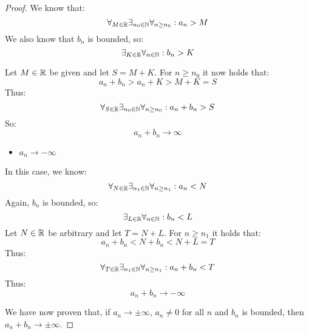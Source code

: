\documentclass[week=3]{homework}
\begin{document}
\begin{questions}
\begin{parts}
\begin{proof}
		    	We know that:
		    	\[
			    	\forall_{M \in \mathbb{R}}\exists_{n_0 \in \mathbb{N}} \forall_{n \ge n_0}: a_n > M
		    	\]
		    	We also know that $b_n$ is bounded, so:
		    	\[
			    	\exists_{K \in \mathbb{R}} \forall_{n \in \mathbb{N}}: b_n > K
		    	\]
		    	
		    	Let $M \in \mathbb{R}$ be given and let $S = M + K$. For $n \ge n_0$ it now holds that:
		    	\[
			    	a_n + b_n > a_n + K > M + K = S
		    	\]
		    	Thus: 
		    	\[
			    	\forall_{S \in \mathbb{R}}\exists_{n_0 \in \mathbb{N}} \forall_{n \ge n_0}: a_n + b_n > S
		    	\]
		    	So:
		    	\[
			    	a_n + b_n \to \infty
		    	\]
		    	
		    	\begin{itemize}
		    		\item $a_n \to - \infty$			    
	    		\end{itemize}
	    		
	    		In this case, we know:
	    		\[
		    		\forall_{N \in \mathbb{R}}\exists_{n_1 \in \mathbb{N}} \forall_{n \ge n_1}: a_n < N
	    		\]
	    		Again, $b_n$ is bounded, so:
	    		\[
		    		\exists_{L \in \mathbb{R}} \forall_{ n \in \mathbb{N}}: b_n < L
	    		\]
	    		Let $N \in \mathbb{R}$ be arbitrary and let $T = N + L$. For $n \ge n_1$ it holds that:
	    		\[
		    		a_n + b_n < N + b_n < N + L = T
	    		\]
	    		Thus:
	    		\[
		    		\forall_{T \in \mathbb{R}}\exists_{n_1 \in \mathbb{N}} \forall_{n \ge n_1}: a_n + b_n < T
	    		\]
	    		Thus: 
	    		\[
		    		a_n + b_n \to - \infty
	    		\]
	    		
	    		We have now proven that, if $a_n \to \pm\infty$, $a_n \neq 0$ for all $n$ and $b_n$ is bounded, then $a_n + b_n \to \pm \infty$.
	    	\end{proof}
    	

\end{parts}
\end{questions}
\end{document}
